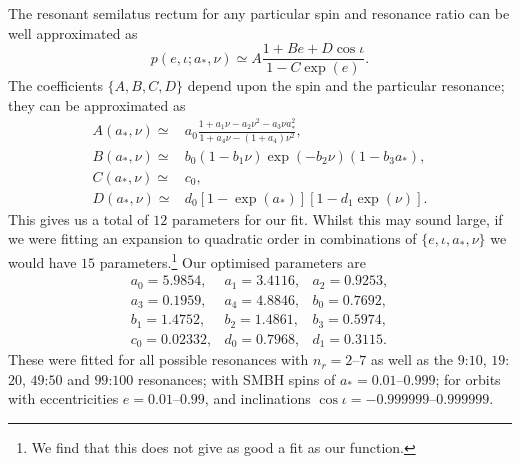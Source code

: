 \documentclass[aps,prd,amsfonts,amssymb,amsmath,nofootinbib,showpacs,superscriptaddress,twocolumn]{revtex4}
\begin{document}
The resonant semilatus rectum for any particular spin and resonance ratio can be well approximated as
\begin{equation}
p(e,\iota;a_\ast,\nu) \simeq A\frac{1 + B e + D \cos\iota}{1 - C\exp(e)}.
\end{equation}
The coefficients $\{A,B,C,D\}$ depend upon the spin and the particular resonance; they can be approximated as
\begin{align} 
A(a_\ast,\nu) \simeq {} & a_0\frac{1 + a_1\nu - a_2 \nu^2 - a_3 \nu a_\ast^2}{1 + a_4\nu - (1 + a_4)\nu^2}, \\
B(a_\ast,\nu) \simeq {} & b_0(1 - b_1\nu)\exp(-b_2\nu)(1 - b_3 a_\ast), \\
C(a_\ast,\nu) \simeq {} & c_0, \\
D(a_\ast,\nu) \simeq {} & d_0\left[1 - \exp(a_\ast)\right]\left[1 - d_1\exp(\nu)\right].
\end{align}
This gives us a total of $12$ parameters for our fit. Whilst this may sound large, if we were fitting an expansion to quadratic order in combinations of $\{e,\iota,a_\ast,\nu\}$ we would have $15$ parameters.\footnote{We find that this does not give as good a fit as our function.} Our optimised parameters are
\begin{equation}
\begin{array}{lll}
a_0 = 5.9854, & a_1 = 3.4116, & a_2 = 0.9253,\\
a_3 = 0.1959, & a_4 = 4.8846, & b_0 = 0.7692,\\
b_1 = 1.4752, & b_2 = 1.4861, & b_3 = 0.5974,\\
c_0 = 0.02332, & d_0 = 0.7968, & d_1 = 0.3115.
\end{array}
\end{equation}
These were fitted for all possible resonances with $n_r = 2$--$7$ as well as the $9$:$10$, $19$:$20$, $49$:$50$ and $99$:$100$ resonances; with SMBH spins of $a_\ast = 0.01$--$0.999$; for orbits with eccentricities $e = 0.01$--$0.99$, and inclinations $\cos\iota = -0.999999$--$0.999999$. 
 
\end{document}
